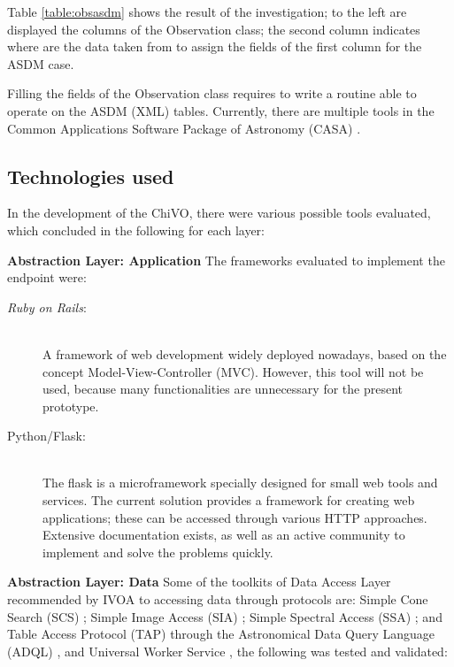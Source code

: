 \documentclass[]{spie}
\newcommand{\ror}{\emph{Ruby on Rails}}
\begin{document}
Table \ref{table:obsasdm} shows the result of the investigation; to the left are displayed the columns of the Observation class; the second column indicates where are the data taken from to assign the fields of the first column for the ASDM case.

Filling the fields of the Observation class requires to write a routine able to operate on the ASDM (XML) tables. Currently, there are multiple tools in the Common Applications Software Package of Astronomy (CASA) \cite{petry2012analysing}.

\subsection{Technologies used}
In the development of the ChiVO, there were various possible tools evaluated, which concluded in the following for each layer:

\textbf{Abstraction Layer:  Application}
The frameworks evaluated to implement the endpoint were: 
\begin{description}
    \item[{\ror}:] \hfill \\
        A framework of web development widely deployed nowadays, based on the concept Model-View-Controller (MVC).  However, this tool will not be used, because many functionalities are unnecessary for the present prototype.
    \item[Python/Flask:] \hfill \\
        The flask is a microframework specially designed for small web tools and services.  The current solution provides a framework for creating web applications; these can be accessed through various HTTP approaches.  Extensive documentation exists, as well as an active community to implement and solve the problems quickly.
\end{description}

\textbf{Abstraction Layer: Data}
Some of the toolkits of Data Access Layer recommended by IVOA to accessing data through protocols are:  Simple Cone Search (SCS) \cite{williams2008simple}; Simple Image Access (SIA) \cite{tody2004simple}; Simple Spectral Access (SSA) \cite{tody2008simple}; and Table Access Protocol (TAP) \cite{dowler2010table} through the Astronomical Data Query Language (ADQL) \cite{yasuda2004astronomical}, and Universal Worker Service \cite{rixon2008universal}, the following was tested and validated:
\end{document}
